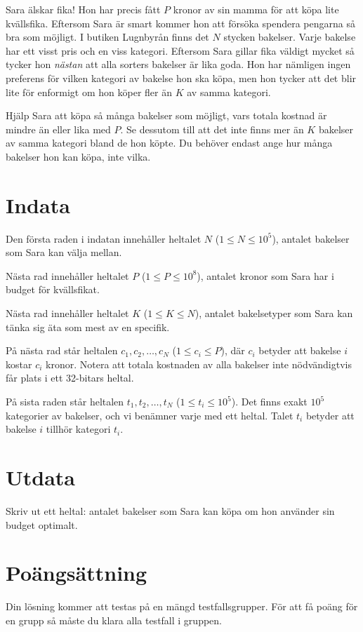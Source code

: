 Sara älskar fika! Hon har precis fått $P$ kronor av sin mamma för att köpa lite kvällsfika.
Eftersom Sara är smart kommer hon att försöka spendera pengarna så bra som möjligt. I butiken Lugnbyrån
finns det $N$ stycken bakelser. Varje bakelse har ett visst pris och en viss kategori.
Eftersom Sara gillar fika väldigt mycket så tycker hon \textit{nästan} att alla sorters bakelser är lika goda. 
Hon har nämligen ingen preferens för vilken kategori av bakelse hon ska köpa, men hon tycker att det blir 
lite för enformigt om hon köper fler än $K$ av samma kategori. 

Hjälp Sara att köpa så många bakelser som möjligt, vars totala kostnad är mindre än eller lika med $P$.
Se dessutom till att det inte finns mer än $K$ bakelser av samma kategori bland de hon köpte. Du behöver
endast ange hur många bakelser hon kan köpa, inte vilka.

\section*{Indata}
Den första raden i indatan innehåller heltalet $N$ ($1 \leq N \leq 10^5$), antalet bakelser som Sara
kan välja mellan. 

Nästa rad innehåller heltalet $P$ ($1 \leq P \leq 10^8$), antalet kronor som Sara har i budget för kvällsfikat.

Nästa rad innehåller heltalet $K$ ($1 \leq K \leq N$), antalet bakelsetyper som Sara kan tänka sig
äta som mest av en specifik.

På nästa rad står heltalen $c_1, c_2, \dots, c_N$ ($1 \leq c_i \leq P$), där $c_i$ betyder att
bakelse $i$ kostar $c_i$ kronor. Notera att totala kostnaden av alla bakelser inte nödvändigtvis
får plats i ett 32-bitars heltal.

På sista raden står heltalen $t_1, t_2, \dots, t_N$ ($1 \leq t_i \leq 10^5$). Det finns exakt $10^5$
kategorier av bakelser, och vi benämner varje med ett heltal. Talet $t_i$ betyder att
bakelse $i$ tillhör kategori $t_i$.

\section*{Utdata}
Skriv ut ett heltal: antalet bakelser som Sara kan köpa om hon använder sin budget optimalt.

\section*{Poängsättning}
Din lösning kommer att testas på en mängd testfallsgrupper.
För att få poäng för en grupp så måste du klara alla testfall i gruppen.

